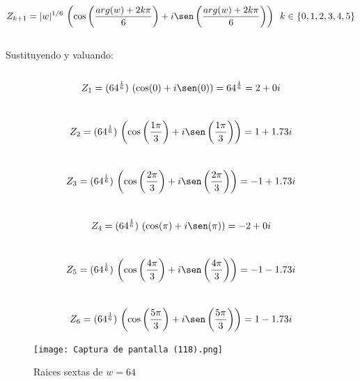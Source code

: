 \documentclass[11pt,letterpaper]{article}
\begin{document}
    \,\\
    \begin{equation*}
        Z_{k+1}=|w|^{1/6}\,\left(\cos\left(\frac{arg(w)+2k\pi}{6}\right)+i\sen\left(\frac{arg(w)+2k\pi}{6}\right)\right)\,\,\,k\in\{0,1,2,3,4,5\}
    \end{equation*}\,\\
    Sustituyendo y valuando:\,\\
    \,\\
    \begin{equation*}
        Z_1=(64^{\frac{1}{6}})\,\left(\cos(0)+i\sen(0)\right)=64^{\frac{1}{6}}=2+0i
    \end{equation*}
\,\\
    \begin{equation*}
        Z_2=(64^{\frac{1}{6}})\,\left(\cos\left(\frac{1\pi}{3}\right)+i\sen\left(\frac{1\pi}{3}\right)\right)=1+1.73i
    \end{equation*}
    \,\\
    \begin{equation*}
        Z_3=(64^{\frac{1}{6}})\,\left(\cos\left(\frac{2\pi}{3}\right)+i\sen\left(\frac{2\pi}{3}\right)\right)=-1+1.73i
    \end{equation*}
    \,\\
    \begin{equation*}
        Z_4=(64^{\frac{1}{6}})\,\left(\cos(\pi)+i\sen(\pi)\right)=-2+0i
    \end{equation*}
    \,\\
    \begin{equation*}
        Z_5=(64^{\frac{1}{6}})\,\left(\cos\left(\frac{4\pi}{3}\right)+i\sen\left(\frac{4\pi}{3}\right)\right)=-1-1.73i
    \end{equation*}
    \,\\
    \begin{equation*}
        Z_6=(64^{\frac{1}{6}})\,\left(\cos\left(\frac{5\pi}{3}\right)+i\sen\left(\frac{5\pi}{3}\right)\right)=1-1.73i
    \end{equation*}
    \begin{figure}[htb]
    \centering
    \texttt{[image: Captura de pantalla (118).png]}
    \caption{Raices sextas de $w=64$}
    \label{Cono rebanado}
\end{figure}
\,\\
\end{document}
